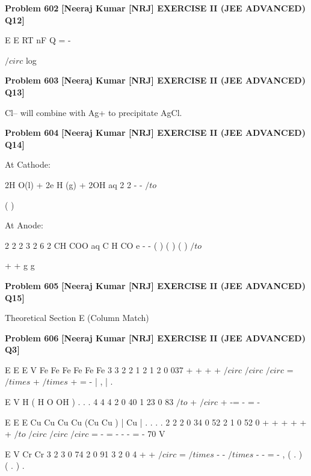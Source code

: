 \begin{problembox}
\textbf{Problem 602} \hfill \textbf{[Neeraj Kumar [NRJ] EXERCISE II (JEE ADVANCED) Q12]}
\label{q:ext-nrj_all_questions-602}

E
E
RT
nF
Q
=
-
 
$/circ$
log
\end{problembox}

\begin{problembox}
\textbf{Problem 603} \hfill \textbf{[Neeraj Kumar [NRJ] EXERCISE II (JEE ADVANCED) Q13]}
\label{q:ext-nrj_all_questions-603}

Cl-- will combine with Ag+ to precipitate AgCl.
\end{problembox}

\begin{problembox}
\textbf{Problem 604} \hfill \textbf{[Neeraj Kumar [NRJ] EXERCISE II (JEE ADVANCED) Q14]}
\label{q:ext-nrj_all_questions-604}

At Cathode: 
 
 
2H O(l) + 2e
H (g) + 2OH
aq
2
2
-
-
 $/to$
 
(
) 
 
 At Anode: 
 
 
2
2
2
3
2
6
2
CH COO
aq
C H
CO
e
-
-
(
)
( )
( )
 $/to$
 
+
+
g
g
\end{problembox}

\begin{problembox}
\textbf{Problem 605} \hfill \textbf{[Neeraj Kumar [NRJ] EXERCISE II (JEE ADVANCED) Q15]}
\label{q:ext-nrj_all_questions-605}

Theoretical
Section E (Column Match)
\end{problembox}

\begin{problembox}
\textbf{Problem 606} \hfill \textbf{[Neeraj Kumar [NRJ] EXERCISE II (JEE ADVANCED) Q3]}
\label{q:ext-nrj_all_questions-606}

E
E
E
V
Fe
Fe
Fe
Fe
Fe
Fe
3
3
2
2
1
2
1
2
0 037
+
+
+
+
$/circ$
$/circ$
$/circ$
=
$/times$
+
$/times$
+
= -
|
,
|
.
 
 
 
E
V
H
( H O
OH )
.
.
.
4
4
4
2
0 40
1 23
0 83
$/to$
+
$/circ$
+
-=
-
= -
 
 
 
E
E
E
Cu
Cu
Cu
Cu
(Cu
Cu
)
| Cu
|
.
.
.
.
2
2
2
0 34
0 52
2
1
0 52
0
+
+
+
+
+
+
$/to$
$/circ$
$/circ$
$/circ$
=
-
=
-
-
-
= -
70 V
 
 
 
E
V
Cr
Cr
3
2
3
0 74
2
0 91
3
2
0 4
+
+
$/circ$
=
$/times$ -
-
$/times$ -
-
= -
,
(
.
)
(
.
)
.
\end{problembox}

